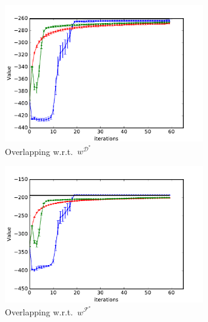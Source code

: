 \documentclass[a4paper,11pt]{report}
\begin{document}
\begin{figure}[h!]
\begin{subfigure}[t]{0.49\columnwidth}
    \includegraphics[trim=0.6cm 0.0cm 0.0cm 0.0cm,clip=true,width=0.95\textwidth]{figures/over_expert_apprentice.pdf}
    \caption{Overlapping w.r.t.\ $w^{\mathcal{D}^*}$}
    \label{fig:toy_expert_apprentice_overlapping}
    \end{subfigure}
   \begin{subfigure}[t]{0.49\columnwidth}
   \hspace{2mm}
    \includegraphics[trim=0.6cm 0.0cm 0.0cm 0.0cm,clip=true,width=0.95\textwidth]{figures/over_taboo_apprentice.pdf}
    \caption{Overlapping w.r.t.\ $w^{\mathcal{F}^*}$}
    \label{fig:toy_taboo_apprentice_overlapping}
    \end{subfigure}
    \\
    \begin{subfigure}[t]{0.49\columnwidth}
   \hspace{2mm}

\end{subfigure}
\end{figure}
\end{document}
